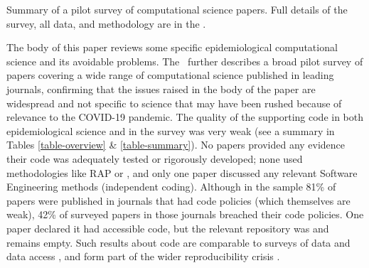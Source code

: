\documentclass{comjnl}
\begin{document}
\begin{change}
\begin{table*}
\begin{center}\normalsize

\end{center}
\caption{Summary of a pilot survey of computational science papers. Full details of the survey, all data, and methodology are in the \supplement.}
\label{table-summary}
\end{table*}
\end{change}

The body of this paper reviews some specific epidemiological computational science and its avoidable problems. The \supplement\ further describes a broad pilot survey of papers covering a wide range of computational science published in leading journals, confirming that the issues raised in the body of the paper are widespread and not specific to science that may have been rushed because of relevance to the COVID-19 pandemic. The quality of the supporting code in both epidemiological science and in the survey was very weak (see a summary in Tables \ref{table-overview} \& \ref{table-summary}). No papers provided any evidence their code was adequately tested or rigorously developed; none used methodologies like RAP or \RAPstarp, and only one paper discussed any relevant Software Engineering methods (independent coding). Although in the sample 81\% of papers were published in journals that had code policies (which themselves are weak), 42\% of surveyed papers in those journals breached their code policies. One paper declared it had accessible code, but the relevant repository was and remains empty. Such results about code are comparable to surveys of data and data access , and form part of the wider reproducibility crisis .
\end{document}
